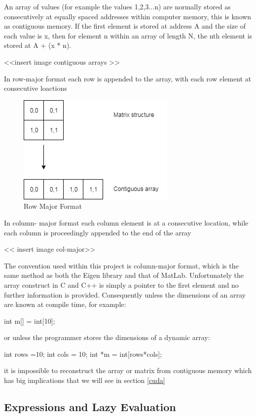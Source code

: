 \documentclass[a4paper]{amsart}
\begin{document}
An array of values (for example the values 1,2,3...n) are normally stored as consecutively at equally spaced addresses within computer memory, this is known as contiguous memory. If the first element is stored at address A and the size of each value is x, then for element n within an array of length N, the nth element is stored at A + (x * n).

<<insert image contiguous arrays >>

In row-major format each row is appended to the array, with each row element at consecutive loactions

\begin{figure}[h]
\centering
\includegraphics[scale=0.5]{RowMajorFormat1.png}
\caption {Row Major Format}
\label {fig:rowmajor}
\end{figure}


In column- major format each column element is at a consecutive location, while each column is proceedingly appended to the end of the array

<< insert image col-major>>

The convention used within this project is column-major format, which is the same method as both the Eigen library and that of MatLab. Unfortunately the array construct in C and C++ is simply a pointer to the first element and no further information is provided. Consequently unless the dimensions of an array are known at compile time, for example:

int m[] = int[10]; 

or unless the programmer stores the dimensions of a dynamic array:

int rows =10;
int cols = 10;
int *m = int[rows*cols];

it is impossible to reconstruct the array or matrix from contiguous memory which has big implications that we will see in section \ref{cuda}


\subsection{Expressions and Lazy Evaluation}
\end{document}
